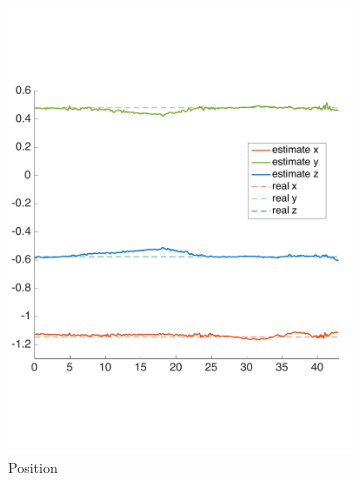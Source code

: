 \begin{figure}[!htbp]
  \centering
   \begin{subfigure}[b]{0.45\textwidth}
        \includegraphics[width=\textwidth]{img/estimate_position_static_platform.pdf}
        \caption{Position }
        \label{fig:one_ekf_real_world_static}
   \end{subfigure}\hfill
   \begin{subfigure}[b]{0.45\textwidth}

\end{subfigure}
\end{figure}
